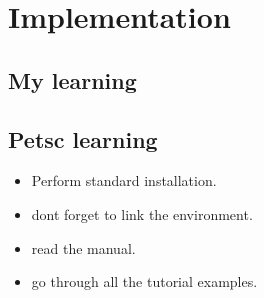 \chapter{Implementation}

\section{My learning}
\begin{itemize}
  
  
 
\end{itemize}

\section{Petsc learning}

\begin{itemize}
  \item Perform standard installation.
  \item dont forget to link the environment.
  \item read the manual.
  \item go through all the tutorial examples.
  
 
\end{itemize}



